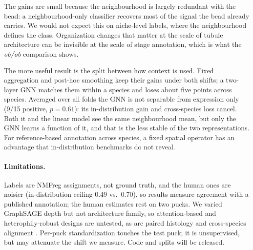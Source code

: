 The gains are small because the neighbourhood is largely redundant with the bead: a neighbourhood-only classifier recovers most of the signal the bead already carries. We would not expect this on niche-level labels, where the neighbourhood defines the class. Organization changes that matter at the scale of tubule architecture can be invisible at the scale of stage annotation, which is what the \emph{ob/ob} comparison shows.

The more useful result is the split between how context is used. Fixed aggregation and post-hoc smoothing keep their gains under both shifts; a two-layer GNN matches them within a species and loses about five points across species. Averaged over all folds the GNN is not separable from expression only (9/15 positive, $p=0.61$): its in-distribution gain and cross-species loss cancel. Both it and the linear model see the same neighbourhood mean, but only the GNN learns a function of it, and that is the less stable of the two representations. For reference-based annotation across species, a fixed spatial operator has an advantage that in-distribution benchmarks do not reveal.

\paragraph{Limitations.} Labels are NMFreg assignments, not ground truth, and the human ones are noisier (in-distribution ceiling 0.49 vs.\ 0.70), so results measure agreement with a published annotation; the human estimates rest on two pucks. We varied GraphSAGE depth but not architecture family, so attention-based and heterophily-robust designs are untested, as are paired histology and cross-species alignment \citep{rosen2024toward, lotfollahi2022mapping}. Per-puck standardization touches the test puck; it is unsupervised, but may attenuate the shift we measure. Code and splits will be released.
